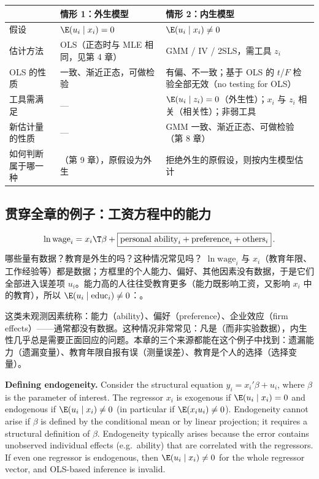 \begin{center}
\small
\begin{tabularx}{\linewidth}{lLL}
\toprule
 & 情形 1：外生模型 & 情形 2：内生模型\\
\midrule
假设 & $\E(u_i\mid x_i)=0$ & $\E(u_i\mid x_i)\neq0$\\
估计方法 & OLS（正态时与 MLE 相同，见第 4 章） & GMM / IV / 2SLS，需工具 $z_i$\\
OLS 的性质 & 一致、渐近正态，可做检验 & 有偏、不一致；基于 OLS 的 $t$/$F$ 检验全部无效（no testing for OLS）\\
工具需满足 & — & $\E(u_i\mid z_i)=0$（外生性）；$x_i$ 与 $z_i$ 相关（相关性）；非弱工具\\
新估计量的性质 & — & GMM 一致、渐近正态、可做检验（第 8 章）\\
如何判断属于哪一种 & （第 9 章），原假设为外生 & 拒绝外生的原假设，则按内生模型估计\\
\bottomrule
\end{tabularx}
\end{center}

\subsection{贯穿全章的例子：工资方程中的能力}

\begin{exmp}[对数工资方程中的“能力”]\label{ex:U07-wage}
\[
\ln \text{wage}_i=x_i\T\beta+\boxed{\text{personal ability}_i+\text{preference}_i+\text{others}_i}\,.
\]
哪些量有数据？教育是外生的吗？这种情况常见吗？
\solution
$\ln\text{wage}_i$ 与 $x_i$（教育年限、工作经验等）都是数据；方框里的个人能力、偏好、其他因素没有数据，于是它们全部进入误差项 $u_i$。能力高的人往往受教育更多（能力既影响工资，又影响 $x_i$ 中的教育），所以 $\E(u_i\mid \text{educ}_i)\neq0$：。

这类未观测因素统称：能力（ability）、偏好（preference）、企业效应（firm effects）——通常都没有数据。这种情况非常常见：凡是（而非实验数据），内生性几乎总是需要正面回应的问题。本章的三个来源都能在这个例子中找到：遗漏能力（遗漏变量）、教育年限自报有误（测量误差）、教育是个人的选择（选择变量）。
\end{exmp}

\begin{english}
\textbf{Defining endogeneity.} Consider the structural equation $y_i=x_i'\beta+u_i$, where $\beta$ is the parameter of interest. The regressor $x_i$ is exogenous if $\E(u_i\mid x_i)=0$ and endogenous if $\E(u_i\mid x_i)\neq0$ (in particular if $\E(x_iu_i)\neq0$). Endogeneity cannot arise if $\beta$ is defined by the conditional mean or by linear projection; it requires a structural definition of $\beta$. Endogeneity typically arises because the error contains unobserved individual effects (e.g.\ ability) that are correlated with the regressors. If even one regressor is endogenous, then $\E(u_i\mid x_i)\neq0$ for the whole regressor vector, and OLS-based inference is invalid.
\end{english}


